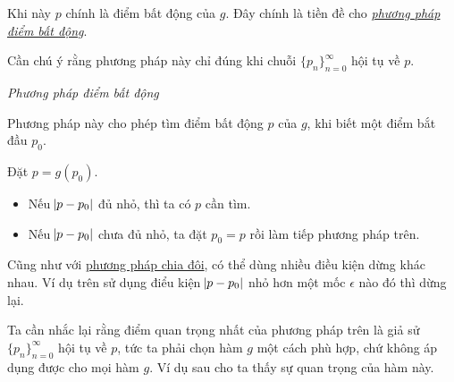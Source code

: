 \documentclass[../../Lectures.tex]{subfiles}
\begin{document}
Khi này \(p\) chính là điểm bất động của \(g\). Đây chính là tiền đề cho
\hyperref[method:fixed_point]{\emph{phương pháp điểm bất động}}.

Cần chú ý rằng phương pháp này chỉ đúng khi chuỗi \(\{p_n\}_{n=0}^\infty\) hội
tụ về \(p\).

\begin{method}\label{method:fixed_point}
    \emph{Phương pháp điểm bất động}

    Phương pháp này cho phép tìm điểm bất động \(p\) của \(g\), khi biết một
    điểm bắt đầu \(p_0\).

    Đặt \(p = g(p_0)\).

    \begin{itemize}
        \item Nếu \(\abs{p - p_0}\) đủ nhỏ, thì ta có \(p\) cần tìm.
        \item Nếu \(\abs{p - p_0}\) chưa đủ nhỏ, ta đặt \(p_0 = p\) rồi làm tiếp
            phương pháp trên.
    \end{itemize}
\end{method}

Cũng như với \hyperref[method:bisection]{phương pháp chia đôi}, có thể dùng
nhiều điều kiện dừng khác nhau. Ví dụ trên sử dụng điểu kiện \(\abs{p - p_0}\)
nhỏ hơn một mốc \(\epsilon\) nào đó thì dừng lại.

Ta cần nhắc lại rằng điểm quan trọng nhất của phương pháp trên là giả sử
\(\{p_n\}_{n=0}^\infty\) hội tụ về \(p\), tức ta phải chọn hàm \(g\) một cách
phù hợp, chứ không áp dụng được cho mọi hàm \(g\). Ví dụ sau cho ta thấy sự quan
trọng của hàm này.
\end{document}
